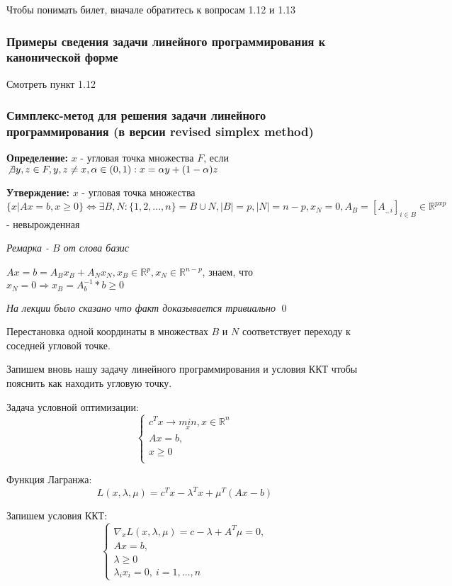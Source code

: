 Чтобы понимать билет, вначале обратитесь к вопросам 1.12 и 1.13

 \subsubsection{Примеры сведения задачи линейного программирования к канонической форме}

 Смотреть пункт 1.12

 \subsubsection{Симплекс-метод для решения задачи линейного программирования (в версии revised simplex method)}

 \textbf{Определение:} $x$ - угловая точка множества $F$, если $\not\exists y, z \in F, y,z \neq x, \alpha \in (0, 1) : x = \alpha y + (1 - \alpha) z$


 \textbf{Утверждение:} $x$ - угловая точка множества $\{ x | Ax = b, x \ge 0 \}  \Leftrightarrow \exists B, N : \{1, 2, ..., n\} = B \cup N , |B| = p, |N| = n - p, x_N = 0, A_B = [A_{.,i}]_{i\in B} \in \mathbb{R}^{p x p} $ - невырожденная


 \textit{Ремарка - $B$ от слова базис}


 $Ax= b = A_B x_B + A_N x_N, x_B \in \mathbb{R}^{p} , x_N \in \mathbb{R}^{n - p}$, знаем, что $x_N = 0 \Rightarrow x_B = A_b^{-1} * b \ge 0$

 \textit{На лекции было сказано что факт доказывается тривиально}
 \qed

 Перестановка одной координаты в множествах $B$ и $N$ соответствует переходу к соседней угловой точке.


 Запишем вновь нашу задачу линейного программирования и условия ККТ чтобы пояснить как находить угловую точку.

 Задача условной оптимизации:
\[
    \begin{cases}
         c^Tx \to \underset{x}{min}, x \in \mathbb{R}^n\\
         Ax = b,\\
         x \ge 0\\
    \end{cases}
\]

Функция Лагранжа:
\[
    L(x, \lambda, \mu) = c^T x - \lambda^T x + \mu^T(Ax - b)
\]

Запишем условия ККТ:
\[
    \begin{cases}
         \nabla_x L(x, \lambda, \mu) = c - \lambda + A^T \mu = 0,\\
         Ax = b,\\
         \lambda \ge 0\\
         \lambda_i x_i = 0, \: i=1,\dots, n
    \end{cases}
\]



